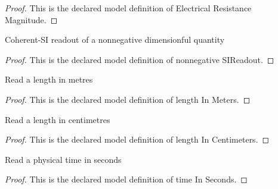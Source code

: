 \begin{proof}
  This is the declared model definition of Electrical Resistance Magnitude.
\end{proof}
\begin{definition}
  \label{def:physics:phyx-mini-0980:phyxminiproblems-problemphyxmini0980-nonnegativesireadout}
  Coherent-SI readout of a nonnegative dimensionful quantity
\end{definition}
\begin{proof}
  This is the declared model definition of nonnegative SIReadout.
\end{proof}
\begin{definition}
  \label{def:physics:phyx-mini-0980:phyxminiproblems-problemphyxmini0980-lengthinmeters}
  Read a length in metres
\end{definition}
\begin{proof}
  This is the declared model definition of length In Meters.
\end{proof}
\begin{definition}
  \label{def:physics:phyx-mini-0980:phyxminiproblems-problemphyxmini0980-lengthincentimeters}
  Read a length in centimetres
\end{definition}
\begin{proof}
  This is the declared model definition of length In Centimeters.
\end{proof}
\begin{definition}
  \label{def:physics:phyx-mini-0980:phyxminiproblems-problemphyxmini0980-timeinseconds}
  Read a physical time in seconds
\end{definition}
\begin{proof}
  This is the declared model definition of time In Seconds.
\end{proof}
